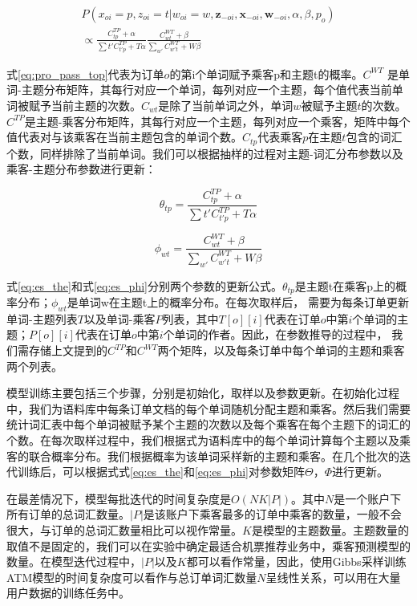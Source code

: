\begin{eqnarray}
\label{eq:pro_pass_top}
P(x_{oi}=p,z_{oi}=t|w_{oi}=w,\mathbf{z}_{-oi},\mathbf{x}_{-oi},\mathbf{w}_{-oi},\alpha,\beta,p_o) \nonumber\\
\propto \frac{C_{tp}^{TP}+\alpha}{\sum{t'}C_{t'p}^{TP}+T\alpha}\frac{C_{wt}^{WT}+\beta}{\sum_{w'}C_{w't}^{WT}+W\beta}
\end{eqnarray}

式\ref{eq:pro_pass_top}代表为订单$o$的第i个单词赋予乘客p和主题t的概率。$C^{WT}$ 是单词-主题分布矩阵，其每行对应一个单词，每列对应一个主题，每个值代表当前单词被赋予当前主题的次数。$C_{wt}$是除了当前单词之外，单词$w$被赋予主题$t$的次数。$C^{TP}$是主题-乘客分布矩阵，其每行对应一个主题，每列对应一个乘客，矩阵中每个值代表对与该乘客在当前主题包含的单词个数。$C_{tp}$代表乘客$p$在主题$t$包含的词汇个数，同样排除了当前单词。我们可以根据抽样的过程对主题-词汇分布参数以及乘客-主题分布参数进行更新：

\begin{equation}
\label{eq:es_the}
\theta_{tp} = \frac{C_{tp}^{TP}+\alpha}{\sum{t'}C_{t'p}^{TP}+T\alpha}
\end{equation}

\begin{equation}
\label{eq:es_phi}
\phi_{wt} = \frac{C_{wt}^{WT}+\beta}{\sum_{w'}C_{w't}^{WT}+W\beta}
\end{equation}

式\ref{eq:es_the}和式\ref{eq:es_phi}分别两个参数的更新公式。$\theta_{tp}$是主题t在乘客p上的概率分布；$\phi_{wt}$是单词w在主题t上的概率分布。在每次取样后，
需要为每条订单更新单词-主题列表$T$以及单词-乘客$P$列表，其中$T[o][i]$代表在订单$o$中第$i$个单词的主题；$P[o][i]$代表在订单$o$中第$i$个单词的作者。因此，在参数推导的过程中，
我们需存储上文提到的$C^{TP}$和$C^{WT}$两个矩阵，以及每条订单中每个单词的主题和乘客两个列表。


模型训练主要包括三个步骤，分别是初始化，取样以及参数更新。在初始化过程中，我们为语料库中每条订单文档的每个单词随机分配主题和乘客。然后我们需要统计词汇表中每个单词被赋予某个主题的次数以及每个乘客在每个主题下的词汇的个数。在每次取样过程中，我们根据式\label{eq:p_xz}为语料库中的每个单词计算每个主题以及乘客的联合概率分布。我们根据概率为该单词采样新的主题和乘客。在几个批次的迭代训练后，可以根据式式\ref{eq:es_the}和\ref{eq:es_phi}对参数矩阵$\Theta$，$\Phi$进行更新。

在最差情况下，模型每批迭代的时间复杂度是$O(NK|P|)$。其中$N$是一个账户下所有订单的总词汇数量。$|P|$是该账户下乘客最多的订单中乘客的数量，一般不会很大，与订单的总词汇数量相比可以视作常量。$K$是模型的主题数量。主题数量的取值不是固定的，我们可以在实验中确定最适合机票推荐业务中，乘客预测模型的数量。在模型迭代过程中，$|P|$以及$K$都可以看作常量，因此，使用Gibbs采样训练ATM模型的时间复杂度可以看作与总订单词汇数量$N$呈线性关系，可以用在大量用户数据的训练任务中。


